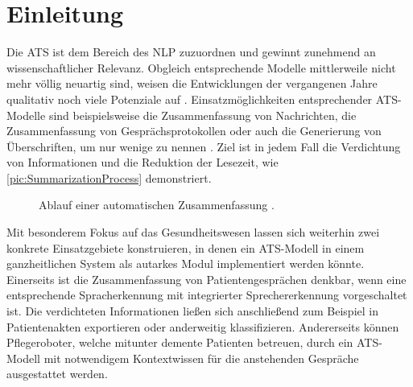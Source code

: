 \chapter{Einleitung}
\thispagestyle{fancy}
\label{chap:Einleitung}

\noindent
Die \ac{ATS} ist dem Bereich des \ac{NLP} zuzuordnen und gewinnt zunehmend an wissenschaftlicher Relevanz. Obgleich entsprechende Modelle mittlerweile nicht mehr völlig neuartig sind, weisen die Entwicklungen der vergangenen Jahre qualitativ noch viele Potenziale auf \cite[S.~1-2]{YAN19}. Einsatzmöglichkeiten entsprechender \ac{ATS}-Modelle sind beispielsweise die Zusammenfassung von Nachrichten, die Zusammenfassung von Gesprächsprotokollen oder auch die Generierung von Überschriften, um nur wenige zu nennen \cite{GON20}. Ziel ist in jedem Fall die Verdichtung von Informationen und die Reduktion der Lesezeit, wie \autoref{pic:SummarizationProcess} demonstriert.\\

\begin{figure}[h]
  \centering
  \caption{Ablauf einer automatischen Zusammenfassung \cite{THA19}.}
  \label{pic:SummarizationProcess}
\end{figure}

\noindent
Mit besonderem Fokus auf das Gesundheitswesen lassen sich weiterhin zwei konkrete Einsatzgebiete konstruieren, in denen ein \ac{ATS}-Modell in einem ganzheitlichen System als autarkes Modul implementiert werden könnte. Einerseits ist die Zusammenfassung von Patientengesprächen denkbar, wenn eine entsprechende Spracherkennung mit integrierter Sprechererkennung vorgeschaltet ist. Die verdichteten Informationen ließen sich anschließend zum Beispiel in Patientenakten exportieren oder anderweitig klassifizieren. Andererseits können Pflegeroboter, welche mitunter demente Patienten betreuen, durch ein \ac{ATS}-Modell mit notwendigem Kontextwissen für die anstehenden Gespräche ausgestattet werden.
\newpage

